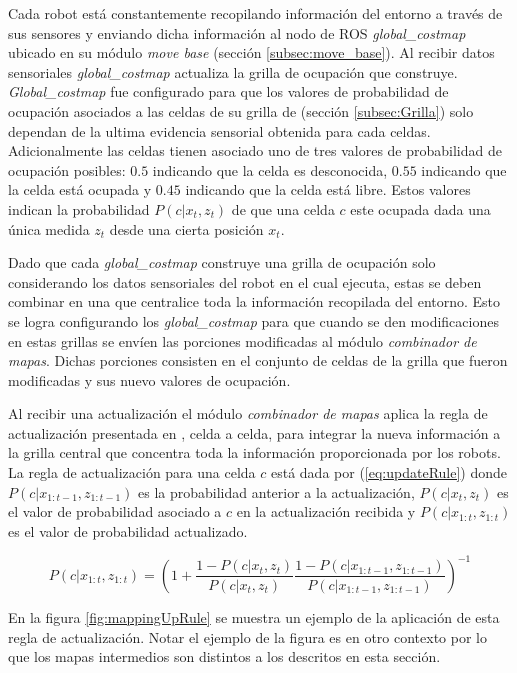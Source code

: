 Cada robot está constantemente recopilando información del entorno a través de
sus sensores y enviando dicha información al nodo de \gls{ROS} \emph{global\_costmap}
ubicado en su módulo \emph{move base} (sección \ref{subsec:move_base}). Al
recibir datos sensoriales \emph{global\_costmap} actualiza la grilla de
ocupación que construye. \emph{Global\_costmap} fue configurado para que los
valores de probabilidad de ocupación asociados a las celdas de su grilla de
(sección \ref{subsec:Grilla}) solo dependan de la ultima evidencia sensorial
obtenida para cada celdas. Adicionalmente las celdas tienen asociado uno de
tres valores de probabilidad de ocupación posibles: $0.5$ indicando que la
celda es desconocida, $0.55$ indicando que la celda está ocupada y $0.45$
indicando que la celda está libre. Estos valores indican la probabilidad
$P(c|x_t,z_t)$ de que una celda $c$ este ocupada dada una única medida $z_t$
desde una cierta posición $x_t$.

Dado que cada \emph{global\_costmap} construye una grilla de ocupación solo
considerando los datos sensoriales del robot en el cual ejecuta, estas se deben
combinar en una que centralice toda la información recopilada del entorno. Esto
se logra configurando los \emph{global\_costmap} para que cuando se den
modificaciones en estas grillas se envíen las porciones modificadas al módulo
\emph{combinador de mapas}. Dichas porciones consisten en el conjunto de celdas
de la grilla que fueron modificadas y sus nuevo valores de ocupación.

Al recibir una actualización el módulo \emph{combinador de mapas} aplica la
regla de actualización presentada en \cite{stachniss2009robotic}, celda a
celda, para integrar la nueva información a la grilla central que concentra
toda la información proporcionada por los robots. La regla de actualización
para una celda $c$ está dada
por (\ref{eq:updateRule}) donde $P(c|x_{1:t-1},z_{1:t-1})$ es la probabilidad
anterior a la actualización, $P(c | x_t,z_t)$ es el valor de probabilidad
asociado a $c$ en la actualización recibida y  $P(c|x_{1:t},z_{1:t})$ es el
valor de probabilidad actualizado. 

\begin{equation}
  P(c|x_{1:t},z_{1:t}) =\left( 1 + \frac{1 - P(c | x_t,z_t)}{P(c|x_t,z_t)} \frac{1 - P(c|x_{1:t-1},z_{1:t-1})}{P(c|x_{1:t-1},z_{1:t-1})} \right)^{-1}
\label{eq:updateRule}
\end{equation}

En la figura \ref{fig:mappingUpRule} se muestra un ejemplo de la aplicación de
esta regla de actualización. Notar el ejemplo de la figura es en otro contexto
por lo que los mapas intermedios son distintos a los descritos en esta sección.

